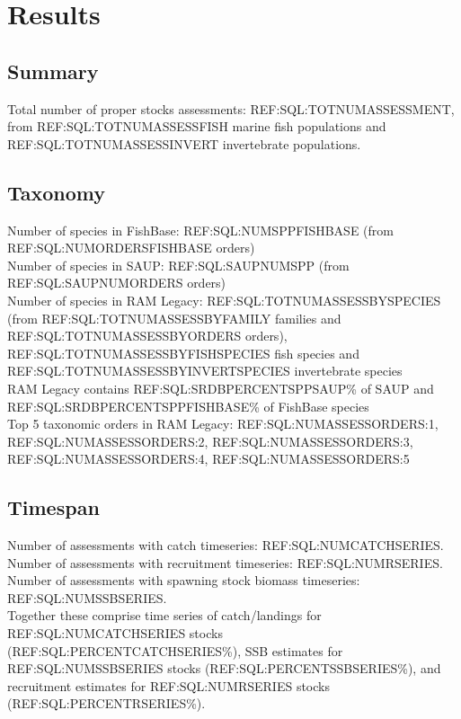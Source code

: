 \section*{Results}
\subsection*{Summary}
\noindent
Total number of proper stocks assessments: REF:SQL:TOTNUMASSESSMENT, from REF:SQL:TOTNUMASSESSFISH marine fish populations and REF:SQL:TOTNUMASSESSINVERT
invertebrate populations.

\subsection*{Taxonomy}
\noindent

Number of species in FishBase: REF:SQL:NUMSPPFISHBASE (from REF:SQL:NUMORDERSFISHBASE orders) \\
Number of species in SAUP: REF:SQL:SAUPNUMSPP (from REF:SQL:SAUPNUMORDERS orders)\\
Number of species in RAM Legacy: REF:SQL:TOTNUMASSESSBYSPECIES (from REF:SQL:TOTNUMASSESSBYFAMILY families and REF:SQL:TOTNUMASSESSBYORDERS orders), REF:SQL:TOTNUMASSESSBYFISHSPECIES fish species and REF:SQL:TOTNUMASSESSBYINVERTSPECIES invertebrate species \\
RAM Legacy contains REF:SQL:SRDBPERCENTSPPSAUP\% of SAUP and REF:SQL:SRDBPERCENTSPPFISHBASE\% of FishBase species\\
Top 5 taxonomic orders in RAM Legacy: REF:SQL:NUMASSESSORDERS:1, REF:SQL:NUMASSESSORDERS:2, REF:SQL:NUMASSESSORDERS:3, REF:SQL:NUMASSESSORDERS:4, REF:SQL:NUMASSESSORDERS:5 \\

\subsection*{Timespan}
\noindent
Number of assessments with catch timeseries: REF:SQL:NUMCATCHSERIES.\\
Number of assessments with recruitment timeseries: REF:SQL:NUMRSERIES.\\
Number of assessments with spawning stock biomass timeseries: REF:SQL:NUMSSBSERIES.\\

Together these comprise time series of
catch/landings for REF:SQL:NUMCATCHSERIES stocks (REF:SQL:PERCENTCATCHSERIES\%),
SSB estimates for REF:SQL:NUMSSBSERIES stocks (REF:SQL:PERCENTSSBSERIES\%), and recruitment estimates for
REF:SQL:NUMRSERIES stocks (REF:SQL:PERCENTRSERIES\%).

